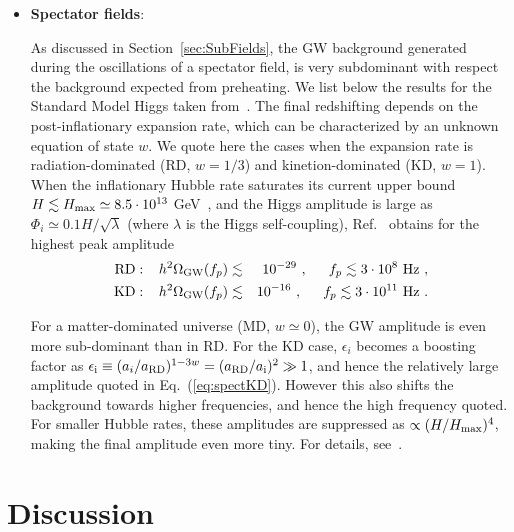 \documentclass[a4paper,11pt]{article}
\newcommand{\bea}{\begin{eqnarray}}
\newcommand{\eea}{\end{eqnarray}}
\begin{document}
\begin{itemize}
\item \textbf{Spectator fields}: 

As discussed in Section~\ref{sec:SubFields}, the GW background generated during the oscillations of a spectator field, is very subdominant with respect the background expected from preheating. We list below the results for the Standard Model Higgs taken from~\cite{Figueroa:2016ojl}. The final redshifting depends on the post-inflationary expansion rate, which can be characterized by an unknown equation of state $w$. We quote here the cases when the expansion rate is radiation-dominated (RD, $w = 1/3$) and kinetion-dominated (KD, $w = 1$). When the inflationary Hubble rate saturates its current upper bound $H \lesssim H_{\rm max} \simeq 8.5\cdot 10^{13}$ GeV~\cite{Ade:2015xua}, and the Higgs amplitude is large as $\Phi_i \simeq 0.1 H/\sqrt{\lambda}$ (where $\lambda$ is the Higgs self-coupling), Ref.~\cite{Figueroa:2016ojl} obtains for the highest peak amplitude
\bea \label{eq:spectRD}
{\rm RD}: \,\,\,\,\, h^2 \Omega_{\rm GW} (f_p) &\lesssim & 10^{-29} \ , \,\,\,\,\,\,\,\,\, f_p \lesssim 3 \cdot 10^8 \,\,{\rm Hz} \ , \\
\label{eq:spectKD}
{\rm KD}: \,\,\,\,\, h^2 \Omega_{\rm GW} (f_p) &\lesssim & 10^{-16} \ , \,\,\,\,\,\,\,\,\, f_p \lesssim 3 \cdot 10^{11} \,\,{\rm Hz} \ .
\eea

For a matter-dominated universe ({\rm MD}, $w \simeq 0$), the GW amplitude is even more sub-dominant than in RD. For the KD case, $\epsilon_i$ becomes a boosting factor as $\epsilon_{\rm i} \equiv (a_i/a_{\rm RD})^{1-3w} = (a_{\rm RD}/a_{\rm i})^2 \gg 1$, and hence the relatively large amplitude quoted in Eq.~(\ref{eq:spectKD}). However this also shifts the background towards higher frequencies, and hence the high frequency quoted. For smaller Hubble rates, these amplitudes are suppressed as $\propto (H/H_{\rm max})^4$, making the final amplitude even more tiny. For details, see~\cite{Figueroa:2016ojl}.
\end{itemize}


\section{Discussion}
\label{sec:discussion}
\end{document}
